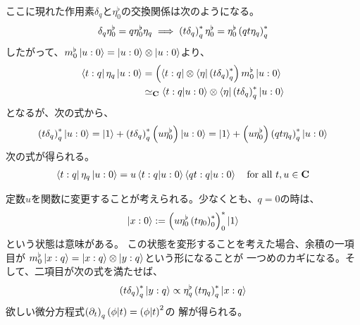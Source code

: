 {	\begin{todo}[ここまで]\label{todo:ここまで} %
	\end{todo} %
	ここに現れた作用素$\delta_q$と$\eta_0^\flat$の交換関係は次のようになる。
	\begin{equation*}\begin{split}
		\delta_q\eta_0^\flat = q\eta_0^\flat\eta_q
		\implies \plr{t\delta_q}_q^*\eta_0^\flat = \eta_0^\flat\plr{qt\eta_q}_q^*
	\end{split}\end{equation*}
	したがって、$m_0^\flat\ket{u:0} = \ket{u:0}\otimes\ket{u:0}$より、
	\begin{equation*}\begin{split}
		\bra{t:q}\eta_q\ket{u:0}
		&= \plr{\bra{t:q}\otimes\bra{\eta}\plr{t\delta_q}_q^*}m_0^\flat
			\ket{u:0} \\
		&\simeq_\fukuso \braket{t:q|u:0}\otimes\braket{\eta|\plr{t\delta_q}_q^*|u:0}
	\end{split}\end{equation*}
	となるが、次の式から、
	\begin{equation*}\begin{split}
		\plr{t\delta_q}_q^*\ket{u:0} = \ket{1} 
			+ \plr{t\delta_q}_q^*\plr{u\eta_0^\flat}\ket{u:0}
		= \ket{1} + \plr{u\eta_0^\flat}\plr{qt\eta_q}_q^*\ket{u:0}
	\end{split}\end{equation*}
	次の式が得られる。
	\begin{equation*}\begin{split}
		\bra{t:q}\eta_q\ket{u:0} = u\braket{t:q|u:0}\braket{qt:q|u:0}
		\quad\text{for all } t,u\in\fukuso
	\end{split}\end{equation*}

	\begin{todo}[式の変形]\label{todo:式の変形} %
		定数$u$を関数に変更することが考えられる。少なくとも、$q=0$の時は、
		\begin{equation*}\begin{split}
			\ket{x:0}:=\plr{u\eta_0^\flat\plr{t\eta_0}_0^*}_0^*\ket{1}
		\end{split}\end{equation*}
		という状態は意味がある。
		この状態を変形することを考えた場合、余積の一項目が
		$m_0^\flat\ket{x:q}=\ket{x:q}\otimes\ket{y:q}$という形になることが
		一つめのカギになる。そして、二項目が次の式を満たせば、
		\begin{equation*}\begin{split}
			\plr{t\delta_q}_q^*\ket{y:q}
			\propto \eta_q^\flat\plr{t\eta_q}_q^*\ket{x:q}
		\end{split}\end{equation*}
		欲しい微分方程式$\plr{\partial_t}_q\plr{\phi|t}=\plr{\phi|t}^2$の
		解が得られる。
	\end{todo} %
}
